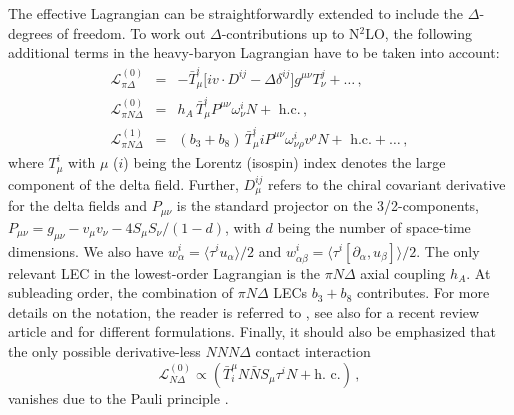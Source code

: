 \documentclass[aps,rmp,nofootinbib,twocolumn,floatfix]{revtex4}
\newcommand{\beq}{\begin{equation}}
\newcommand{\eeq}{\end{equation}}
\newcommand{\nn}{\nonumber \\ }
\begin{document}
The effective Lagrangian can be straightforwardly extended to include the
$\Delta$-degrees of freedom. To work out $\Delta$-contributions up to N$^2$LO,
the following additional terms in the heavy-baryon Lagrangian have to be taken
into account:
\begin{eqnarray}
\label{lagr}
\mathcal{L}_{\pi \Delta}^{(0)} &=& 
- \bar{T}_\mu^i \big[   i v \cdot D^{ij} - \Delta \delta^{ij} \big] 
g^{\mu \nu} T_\nu^j  + \ldots \,, \nn
\mathcal{L}_{\pi N \Delta}^{(0)} &=& h_A \, \bar T_\mu^i  P^{\mu \nu} \omega^i_{\nu } 
  N + \mbox{ h.c.} \,,
 \nn
\mathcal{L}_{\pi N \Delta}^{(1)} &=&  
 (b_3 + b_8 ) \, \bar T_\mu^i i P^{\mu \nu} \omega^i_{\nu \rho} v^\rho
  N + \mbox{ h.c.}  + \ldots \,,
\end{eqnarray}
where 
$T_\mu^i$ with $\mu$ ($i$) being the Lorentz (isospin) index 
denotes the large component of the delta field. 
Further, $D_\mu^{ij}$ refers to the chiral covariant derivative for the delta 
fields and $P_{\mu \nu}$ is the standard projector on the 3/2-components, 
$P_{\mu \nu} = g_{\mu \nu} - v_\mu v_\nu - 4S_\mu S_\nu /(1-d)$, 
with $d$ being the number of space-time dimensions. We also have $w_\alpha^i = 
\langle \tau^i u_\alpha \rangle /2$ and  $w_{\alpha\beta}^i =
\langle \tau^i [\partial_\alpha , u_\beta] \rangle / 2$. The only relevant LEC
in the lowest-order Lagrangian is the $\pi N \Delta$ axial coupling
$h_A$. At subleading order, the combination of $\pi N\Delta $ LECs $b_3 +b_8$
contributes. For more details
on the notation, the reader is referred to 
\cite{Hemmert:1997ye,Fettes:2000bb}, see also \cite{Bernard:2007zu} for a
recent review article and \cite{Pascalutsa:1998pw,Hacker:2005fh} for different
formulations.   
Finally, it should also be emphasized that 
the only possible derivative-less $NNN\Delta$ contact interaction 
\beq
\mathcal{L}_{N\Delta}^{(0)} \propto 
 ( \bar{T}_i^\mu N\bar{N}S_\mu\tau^i N + \mbox{h.~c.} )\,,
\eeq
vanishes due to the Pauli principle \cite{Epelbaum:2007sq}. 
\end{document}
